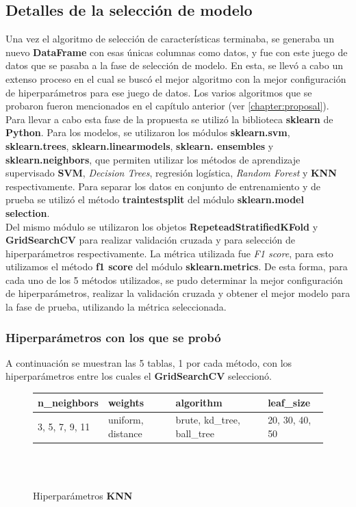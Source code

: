 	\subsection{Detalles de la selección de modelo}
		Una vez el algoritmo de selección de características terminaba, se generaba un nuevo \textbf{DataFrame} con esas únicas columnas como datos,
		y fue con este juego de datos que se pasaba a la fase de selección de modelo. En esta, se llevó a cabo un extenso proceso en el cual se buscó
		el mejor algoritmo con la mejor configuración de hiperparámetros para ese juego de datos. Los varios algoritmos que se probaron fueron
		mencionados en el capítulo anterior (ver \ref {chapter:proposal}).\\
		\indent Para llevar a cabo esta fase de la propuesta se utilizó la biblioteca \textbf{sklearn} de \textbf{Python}.
		Para los modelos, se utilizaron los módulos \textbf{sklearn.svm}, \textbf{sklearn.trees}, \textbf{sklearn.linear\textunderscore models},
		\textbf{sklearn. ensembles} y \textbf{sklearn.neighbors}, que permiten utilizar los métodos de aprendizaje supervisado \textbf{SVM}, \emph
		{Decision Trees}, regresión logística, \emph{Random Forest} y \textbf{KNN} respectivamente. Para separar los datos en conjunto de entrenamiento
		y de prueba se utilizó el método \textbf{train\textunderscore test\textunderscore split} del módulo \textbf{sklearn.model\textunderscore
		selection}.\\
		\indent Del mismo módulo se utilizaron los objetos \textbf {RepeteadStratifiedKFold} y \textbf{GridSearchCV} para realizar validación cruzada y
		para selección de hiperparámetros respectivamente. La métrica utilizada fue \emph{F1 score}, para esto utilizamos el método \textbf{f1\textunderscore
		score} del módulo \textbf{sklearn.metrics}. De esta forma, para cada uno de los 5 métodos utilizados, se pudo determinar la mejor configuración
		de hiperparámetros, realizar la validación cruzada y obtener el mejor modelo para la fase de prueba, utilizando la métrica seleccionada.\\

		\subsubsection{Hiperparámetros con los que se probó}
			A continuación se muestran las 5 tablas, 1 por cada método, con los hiperparámetros entre los cuales el \textbf{GridSearchCV} seleccionó.\\

			\begin{figure}[ht!]
				\centering
				\begin{tabular}{llll}
					\toprule
						   n\_neighbors &            weights &                  algorithm &       leaf\_size \\
					\midrule
					 3, 5, 7, 9, 11 &  uniform, distance &  brute, kd\_tree, ball\_tree &  20, 30, 40, 50 \\
					\bottomrule
				\end{tabular}\\\\
				\caption{Hiperparámetros \textbf{KNN}}
				\label{table:1}
			\end{figure}


